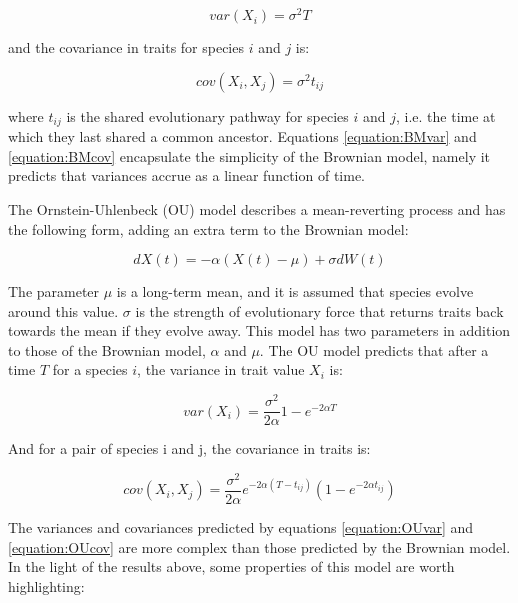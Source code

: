\documentclass[a4paper,12pt]{article}
\begin{document}
    \begin{equation}
      var(X_i) = \sigma^2 T
      \label{equation:BMvar} 
    \end{equation}

  and the covariance in traits for species $i$ and $j$ is:
  
    \begin{equation}
      cov(X_i,X_j) = \sigma^2 t_{ij}
      \label{equation:BMcov} 
    \end{equation}

  where $t_{ij}$ is the shared evolutionary pathway for species $i$ and $j$, i.e. the time at which they last shared a common ancestor. 
  Equations \ref{equation:BMvar} and \ref{equation:BMcov} encapsulate the simplicity of the Brownian model, namely it predicts that variances accrue as a linear function of time. 

  The Ornstein-Uhlenbeck (OU) model describes a mean-reverting process and has the following form, adding an extra term to the Brownian model:

  \begin{equation}
    dX(t) = - \alpha (X(t) - \mu) + \sigma dW(t)
    \label{equation:OUrate} 
  \end{equation}

  The parameter $\mu$ is a long-term mean, and it is assumed that species evolve around this value. 
  $\sigma$ is the strength of evolutionary force that returns traits back towards the mean if they evolve away. 
  This model has two parameters in addition to those of the Brownian model, $\alpha$ and $\mu$.
  The OU model predicts that after a time $T$ for a species $i$, the variance in trait value $X_i$ is:

    \begin{equation}
      var(X_i) = \frac{\sigma^2}{2 \alpha} 1 - e^{-2 \alpha T}
      \label{equation:OUvar} 
    \end{equation}

  And for a pair of species i and j, the covariance in traits is:

    \begin{equation}
      cov(X_i, X_j) = \frac{\sigma^2}{2 \alpha} e^{-2 \alpha (T - t_{ij})} (1 - e^{-2\alpha t_{ij}})
      \label{equation:OUcov} 
    \end{equation}

  The variances and covariances predicted by equations \ref{equation:OUvar} and \ref{equation:OUcov} are more complex than those predicted by the Brownian model. 
  In the light of the results above, some properties of this model are worth highlighting:
\end{document}
